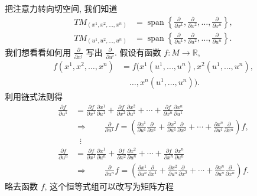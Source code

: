 把注意力转向切空间, 我们知道
\[
\begin{aligned}
TM_{(x^1,x^2,\ldots,x^n)}&=\operatorname{span}\left\{\frac{\partial}{\partial x^1},\frac{\partial}{\partial x^2},\ldots,\frac{\partial}{\partial x^n}\right\},\\
TM_{(u^1,u^2,\ldots,u^n)}&=\operatorname{span}\left\{\frac{\partial}{\partial u^1},\frac{\partial}{\partial u^2},\ldots,\frac{\partial}{\partial u^n}\right\}.
\end{aligned}
\]
我们想看看如何用 $\frac{\partial}{\partial x^j}$ 写出 $\frac{\partial}{\partial u^i}$. 假设有函数 $f:M\to\mathbb{R}$, 
\[
\begin{aligned}
f(x^1,x^2,\ldots,x^n)&=f\bigl(x^1(u^1,\ldots,u^n),x^2(u^1,\ldots,u^n),\\
&\quad\ldots,x^n(u^1,\ldots,u^n)\bigr).
\end{aligned}
\]
利用链式法则得
\begin{align*}
\frac{\partial f}{\partial u^1}&=\frac{\partial f}{\partial x^1}\frac{\partial x^1}{\partial u^1}+\frac{\partial f}{\partial x^2}\frac{\partial x^2}{\partial u^1}+\cdots+\frac{\partial f}{\partial x^n}\frac{\partial x^n}{\partial u^1}\\
&\Rightarrow\qquad\frac{\partial}{\partial u^1}f=\left(\frac{\partial x^1}{\partial u^1}\frac{\partial}{\partial x^1}+\frac{\partial x^2}{\partial u^1}\frac{\partial}{\partial x^2}+\cdots+\frac{\partial x^n}{\partial u^1}\frac{\partial}{\partial x^n}\right)f,\\
&\;\;\vdots\\
\frac{\partial f}{\partial u^n}&=\frac{\partial f}{\partial x^1}\frac{\partial x^1}{\partial u^n}+\frac{\partial f}{\partial x^2}\frac{\partial x^2}{\partial u^n}+\cdots+\frac{\partial f}{\partial x^n}\frac{\partial x^n}{\partial u^n}\\
&\Rightarrow\qquad\frac{\partial}{\partial u^n}f=\left(\frac{\partial x^1}{\partial u^n}\frac{\partial}{\partial x^1}+\frac{\partial x^2}{\partial u^n}\frac{\partial}{\partial x^2}+\cdots+\frac{\partial x^n}{\partial u^n}\frac{\partial}{\partial x^n}\right)f.
\end{align*}
略去函数 $f$, 这个恒等式组可以改写为矩阵方程
